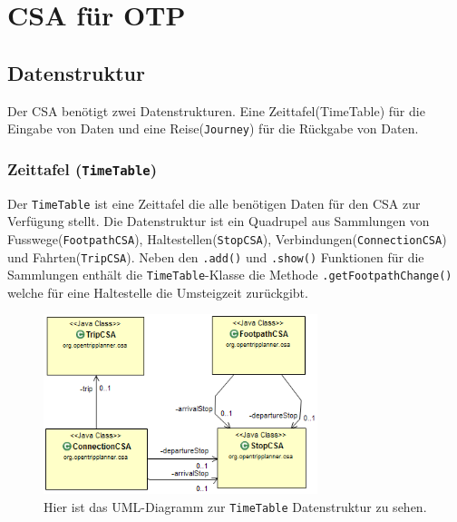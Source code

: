 \section{CSA für OTP}

\subsection{Datenstruktur}
Der CSA benötigt zwei Datenstrukturen. Eine Zeittafel(TimeTable) für die Eingabe von Daten und eine Reise(\texttt{Journey}) für die Rückgabe von Daten. 

\subsubsection{Zeittafel (\texttt{TimeTable})}
Der \texttt{TimeTable} ist eine Zeittafel die alle benötigen Daten für den CSA zur Verfügung stellt. Die Datenstruktur ist ein Quadrupel aus Sammlungen von Fusswege(\texttt{FootpathCSA}), Haltestellen(\texttt{StopCSA}), Verbindungen(\texttt{ConnectionCSA}) und Fahrten(\texttt{TripCSA}).\newline 
Neben den \texttt{.add()} und \texttt{.show()} Funktionen für die Sammlungen enthält die \texttt{TimeTable}-Klasse die Methode \texttt{.getFootpathChange()} welche für eine Haltestelle die Umsteigzeit zurückgibt.

\begin{figure}[htb]
	\centering
	\includegraphics[width=8cm]{img/UML-TimeTable.png}
	\caption{Hier ist das UML-Diagramm zur \texttt{TimeTable} Datenstruktur zu sehen.}
	\label{fig:uml-timetable}
\end{figure}

